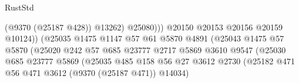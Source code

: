 \begin{lexlean}{RustStd}
\begin{coremodule}
                                                        (@9370 (@25187 @428))
                                                        @13262)
                                                      @25080)))
                                                @20150
                                                @20153
                                                @20156
                                                @20159
                                                @10124))
                                            (@25035
                                              @1475
                                              @1147
                                              @57
                                              @61
                                              @5870
                                              @4891
                                              (@25043
                                                @1475
                                                @57
                                                @5870
                                                (@25020
                                                  @242
                                                  @57
                                                  @685
                                                  @23777
                                                  @2717
                                                  @5869
                                                  @3610
                                                  @9547
                                                  (@25030
                                                    @685
                                                    @23777
                                                    @5869
                                                    (@25035
                                                      @485
                                                      @158
                                                      @56
                                                      @27
                                                      @3612
                                                      @2730
                                                      (@25182
                                                        @471
                                                        @56
                                                        @471
                                                        @3612
                                                        (@9370 (@25187 @471))
                                                        @14034)

\end{coremodule}
\end{lexlean}
